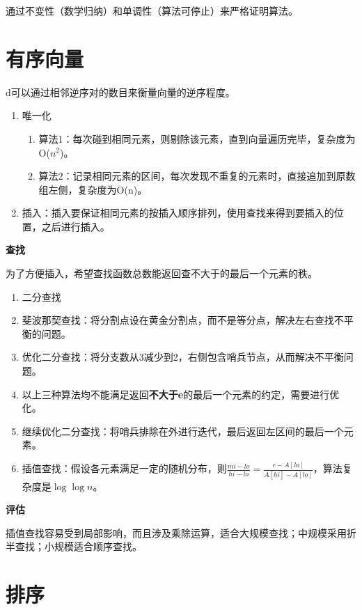 \documentclass{article}
\begin{document}
通过不变性（数学归纳）和单调性（算法可停止）来严格证明算法。

\section{有序向量}

d可以通过相邻逆序对的数目来衡量向量的逆序程度。

\begin{enumerate}
  \item 唯一化
        \begin{enumerate}
          \item 算法1：每次碰到相同元素，则剔除该元素，直到向量遍历完毕，复杂度为O($n^2$)。
          \item 算法2：记录相同元素的区间，每次发现不重复的元素时，直接追加到原数组左侧，复杂度为O(n)。
        \end{enumerate}
  \item 插入：插入要保证相同元素的按插入顺序排列，使用查找来得到要插入的位置，之后进行插入。
\end{enumerate}

\textbf{查找}

为了方便插入，希望查找函数总数能返回查不大于的最后一个元素的秩。

\begin{enumerate}
  \item 二分查找
  \item 斐波那契查找：将分割点设在黄金分割点，而不是等分点，解决左右查找不平衡的问题。
  \item 优化二分查找：将分支数从3减少到2，右侧包含哨兵节点，从而解决不平衡问题。
  \item 以上三种算法均不能满足返回\textbf{不大于e}的最后一个元素的约定，需要进行优化。
  \item 继续优化二分查找：将哨兵排除在外进行迭代，最后返回左区间的最后一个元素。
  \item 插值查找：假设各元素满足一定的随机分布，则$\frac{mi-lo}{hi-lo} = \frac{e-A[lo]}{A[hi]-A[lo]}$，算法复杂度是$\log \log n$。
\end{enumerate}

\textbf{评估}

插值查找容易受到局部影响，而且涉及乘除运算，适合大规模查找；中规模采用折半查找；小规模适合顺序查找。

\section{排序}
\end{document}

